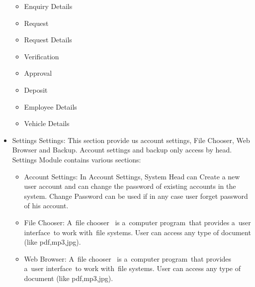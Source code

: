 \begin{itemize}
\begin{itemize}
\item Enquiry Details
\item Request
\item Request Details
\item Verification
\item Approval
\item Deposit
\item Employee Details
\item Vehicle Details
\end{itemize}
\item Settings\newline
 Settings: This section provide us account settings, File Chooser, Web Browser and Backup. Account settings and backup only access by head.\newline
Settings Module contains various sections:
\begin{itemize}
\item Account Settings: In Account Settings, System Head can Create a new user account and can change the password of existing accounts in the system. Change Password can be used if in any case user forget password of his account.
\item File Chooser: A file chooser  is a computer program that provides a user interface to work with file systems. User can access any type of document (like pdf,mp3,jpg).
\item Web Browser: A file chooser  is a computer program that provides a user interface to work with file systems. User can access any type of document (like pdf,mp3,jpg).

\end{itemize}
\end{itemize}





